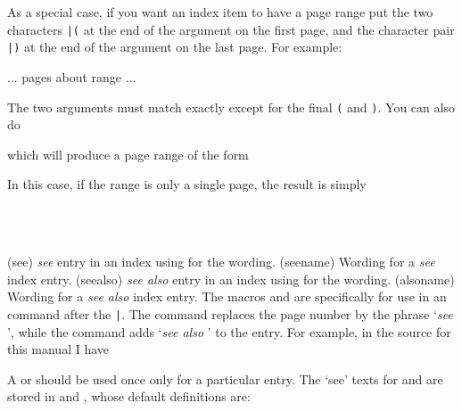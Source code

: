 {    As a special case, if you want an index item to have a page range 
put the two
characters \verb?|(? at the end of the argument on the first page, and 
the character pair \verb?|)? at the end of the argument on the last page.
For example:
\begin{lcode}
...  pages about range   ...
\end{lcode}
The two arguments must match exactly except for the final \verb?(? 
and \verb?)?. You can also do
\begin{lcode}
\end{lcode}
which will produce a page range of the form
\begin{lcode}
\end{lcode}
In this case, if the range is only a single page, the result is simply
\begin{lcode}
\end{lcode}

\begin{syntax}
\cmd{\see}  \\
\cmd{\seealso}  \\
\end{syntax}
\glossary(see)%
  {}%
  {\textit{see} entry in an index using  for the wording.} 
\glossary(seename)%
  {}%
  {Wording for a \textit{see} index entry.}
\glossary(seealso)%
  {}%
  {\textit{see also} entry in an index using  for the wording.} 
\glossary(alsoname)%
  {}%
  {Wording for a \textit{see also} index entry.}
The macros \cmd{\see} and 
\cmd{\seealso} are specifically for use in
an \cmd{\index} command after the \texttt{|}. The \cmd{\see} command
replaces the page number by the phrase `\textit{see} ', 
while the \cmd{\seealso} command adds `\textit{see also} ' 
to the entry. 
For example, in the source for this manual I have
\begin{lcode}
\end{lcode}
A \cmd{\see} or \cmd{\seealso}
should be used once only for a particular entry. The `see' texts for 
\cmd{\see} and \cmd{\seealso} are stored in \cmd{\seename}
and \cmd{\alsoname}, whose default definitions are:
\begin{lcode}
\newcommand*{\seename}{see}
\newcommand*{alsoname}{see also}
\end{lcode}

}
